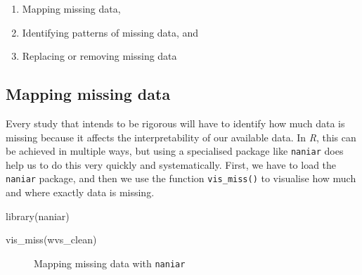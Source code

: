\documentclass[
  letterpaper,
  DIV=11,
  numbers=noendperiod]{scrreprt}
\newenvironment{Shaded}{\begin{snugshade}}{\end{snugshade}}
\newcommand{\FunctionTok}[1]{\textcolor[rgb]{0.28,0.35,0.67}{#1}}
\newcommand{\NormalTok}[1]{\textcolor[rgb]{0.00,0.23,0.31}{#1}}
\begin{document}
\begin{enumerate}
\def\labelenumi{\arabic{enumi}.}
\item
  Mapping missing data,
\item
  Identifying patterns of missing data, and
\item
  Replacing or removing missing data
\end{enumerate}

\subsection{Mapping missing data}\label{sec-mapping-missing-data}

Every study that intends to be rigorous will have to identify how much
data is missing because it affects the interpretability of our available
data. In \emph{R}, this can be achieved in multiple ways, but using a
specialised package like \texttt{naniar} does help us to do this very
quickly and systematically. First, we have to load the \texttt{naniar}
package, and then we use the function \texttt{vis\_miss()} to visualise
how much and where exactly data is missing.

\begin{Shaded}
\begin{Highlighting}[]
\FunctionTok{library}\NormalTok{(naniar)}

\FunctionTok{vis\_miss}\NormalTok{(wvs\_clean)}
\end{Highlighting}
\end{Shaded}

\begin{figure}[H]


\caption{\label{fig-mapping-missing-data}Mapping missing data with
\texttt{naniar}}

\end{figure}%
\end{document}
